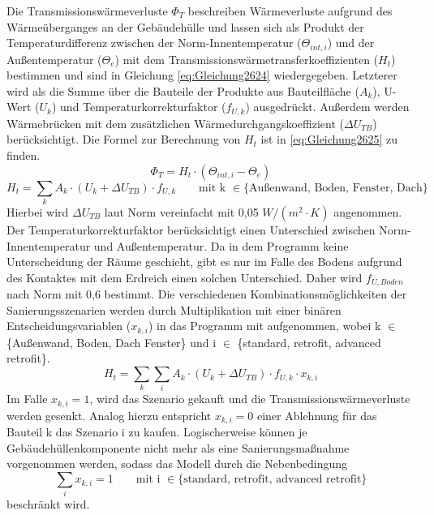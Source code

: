 Die Transmissionswärmeverluste \(\Phi_T\) beschreiben Wärmeverluste aufgrund des Wärmeüberganges an der Gebäudehülle und lassen sich als Produkt der Temperaturdifferenz zwischen der Norm-Innentemperatur (\(\Theta_{int, i}\)) und der Außentemperatur (\(\Theta_e\)) mit dem Transmissionswärmetransferkoeffizienten (\(H_t\)) bestimmen und sind in Gleichung \ref{eq:Gleichung2624} wiedergegeben.
Letzterer wird als die Summe über die Bauteile der Produkte aus Bauteilfläche (\(A_k\)), U-Wert (\(U_k\)) und Temperaturkorrekturfaktor (\(f_{U,k}\)) ausgedrückt.
Außerdem werden Wärmebrücken mit dem zusätzlichen Wärmedurchgangskoeffizient (\(\Delta U_{TB}\)) berücksichtigt.
Die Formel zur Berechnung von \(H_t\) ist in \ref{eq:Gleichung2625} zu finden.
\begin{equation}
\label{eq:Gleichung2624}
\Phi_T = H_t \cdot (\Theta_{int, i} - \Theta_e)
\end{equation}
\begin{equation}
\label{eq:Gleichung2625}
H_t = \sum_{k} A_k \cdot (U_k + \Delta U_{TB}) \cdot f_{U,k} \qquad \text{mit k }\in \{\text{Außenwand, Boden, Fenster, Dach}\}
\end{equation}
Hierbei wird \(\Delta U_{TB}\) laut Norm vereinfacht mit 0,05 \(W/(m^2\cdot K)\) angenommen.
Der Temperaturkorrekturfaktor berücksichtigt einen Unterschied zwischen Norm-Innentemperatur und Außentemperatur.
Da in dem Programm keine Unterscheidung der Räume geschieht, gibt es nur im Falle des Bodens aufgrund des Kontaktes mit dem Erdreich einen solchen Unterschied.
Daher wird \(f_{U, Boden}\) nach Norm mit 0,6 bestimmt.
Die verschiedenen Kombinationsmöglichkeiten der Sanierungsszenarien werden durch Multiplikation mit einer binären Entscheidungsvariablen (\(x_{k, i}\)) in das Programm mit aufgenommen, wobei k \(\in\) \{Außenwand, Boden, Dach Fenster\} und i \(\in\) \{standard, retrofit, advanced retrofit\}.
\begin{equation}
\label{eq:Gleichung2626}
H_t = \sum_{k} \sum_{i} A_k \cdot (U_k + \Delta U_{TB}) \cdot f_{U,k} \cdot x_{k, i}
\end{equation}
Im Falle \(x_{k, i} = 1\), wird das Szenario gekauft und die Transmissionswärmeverluste werden gesenkt.
Analog hierzu entspricht \(x_{k, i} = 0\) einer Ablehnung für das Bauteil k das Szenario i zu kaufen.
Logischerweise können je Gebäudehüllenkomponente nicht mehr als eine Sanierungsmaßnahme vorgenommen werden, sodass das Modell durch die Nebenbedingung 
\begin{equation}
\label{eq:Gleichung2627}
\sum_{i} x_{k, i} = 1 \qquad \text{mit i } \in \{\text{standard, retrofit, advanced retrofit}\}
\end{equation}
beschränkt wird.

